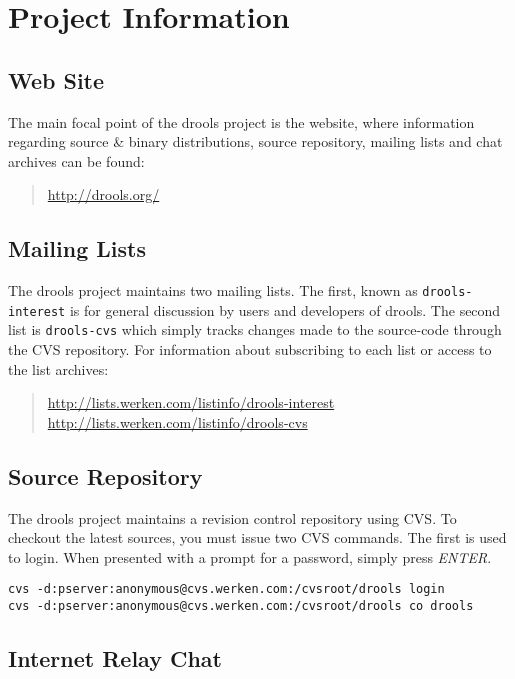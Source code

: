 \chapter{Project Information}


\section{Web Site}

The main focal point of the drools project is the website, where
information regarding source \& binary distributions, source
repository, mailing lists and chat archives can be found:

\begin{quote}
    \url{http://drools.org/}
\end{quote}

\section{Mailing Lists}

The drools project maintains two mailing lists.  The first, known as
\verb|drools-interest| is for general discussion by users and
developers of drools.  The second list is \verb|drools-cvs| which
simply tracks changes made to the source-code through the CVS
repository. For information about subscribing to each list or access 
to the list archives:

\begin{quote}
    \url{http://lists.werken.com/listinfo/drools-interest}\\
    \url{http://lists.werken.com/listinfo/drools-cvs}
\end{quote}

\section{Source Repository}

The drools project maintains a revision control repository using
CVS.  To checkout the latest sources, you must issue two CVS commands.
The first is used to login.  When presented with a prompt for a
password, simply press \emph{ENTER}.

\begin{verbatim}
cvs -d:pserver:anonymous@cvs.werken.com:/cvsroot/drools login
cvs -d:pserver:anonymous@cvs.werken.com:/cvsroot/drools co drools
\end{verbatim}

\section{Internet Relay Chat}

